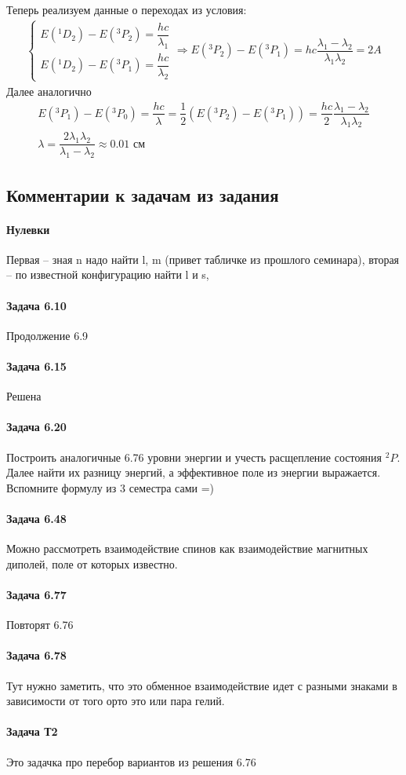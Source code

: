 \documentclass[12pt]{article}
\begin{document}
Теперь реализуем данные о переходах из условия:
\begin{gather*}
\begin{cases}
    E(^1D_2) - E(^3P_2) = \dfrac{hc}{\lambda_1}\\
    E(^1D_2) - E(^3P_1) = \dfrac{hc}{\lambda_2}
\end{cases}
\Rightarrow E(^3P_2) - E(^3P_1)= hc \dfrac{\lambda_1-\lambda_2}{\lambda_1\lambda_2} =2A
\end{gather*}
Далее аналогично 
\begin{gather*}
E(^3P_1) - E(^3P_0) = \dfrac{hc}{\lambda} = \dfrac{1}{2}(E(^3P_2) - E(^3P_1))= \dfrac{hc}{2} \dfrac{\lambda_1-\lambda_2}{\lambda_1\lambda_2}\\
\lambda = \dfrac{2\lambda_1\lambda_2}{\lambda_1-\lambda_2} \approx 0.01 \text{ см}
\end{gather*}
\subsection{Комментарии к задачам из задания}
\paragraph{Нулевки}  Первая -- зная n надо найти l, m (привет табличке из прошлого семинара), вторая -- по известной конфигурацию найти l и s, 
\paragraph{Задача 6.10} Продолжение 6.9
\paragraph{Задача 6.15} Решена
\paragraph{Задача 6.20} Построить аналогичные 6.76 уровни энергии и учесть расщепление состояния $^2P$. Далее найти их разницу энергий, а эффективное поле из энергии выражается. Вспомните формулу из 3 семестра сами =)
\paragraph{Задача 6.48} Можно рассмотреть взаимодействие спинов как взаимодействие магнитных диполей, поле от которых известно.
\paragraph{Задача 6.77} Повторят 6.76
\paragraph{Задача 6.78} Тут нужно заметить, что это обменное взаимодействие идет с разными знаками в зависимости от того орто это или пара гелий.
\paragraph{Задача Т2} Это задачка про перебор вариантов из решения 6.76
\end{document}
